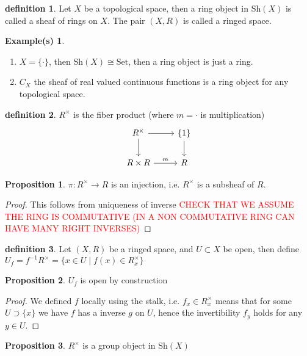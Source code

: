 \documentclass[10.5pt]{article}
\theoremstyle{definition}
\newtheorem{proposition}{Proposition}
\newtheorem{definition}{definition}
\newtheorem*{example}{Example(s)}
\newcommand{\set}[1]{\{#1\}}
\begin{document}
    \begin{definition}
        Let \(X\) be a topological space, then a ring object in \(\text{Sh}(X)\) is called a sheaf of rings on \(X\). The pair \((X,R)\) is called a ringed space.
    \end{definition}

    \begin{example}
        \begin{enumerate}
            \item \(X = \set{\cdot}\), then \(\text{Sh}(X) \cong \text{Set}\), then a ring object is just a ring.
            \item \(C_X\) the sheaf of real valued continuous functions is a ring object for any topological space.
        \end{enumerate}
    \end{example}

    \begin{definition}
        \(R^\times\) is the fiber product (where \(m = \cdot\) is multiplication)
        \begin{equation*}
            \begin{tikzcd}
                R^\times \arrow[r] \arrow[d,""] &\set{1} \arrow[d,""] \\ R\times R \arrow[r,"m"] & R
            \end{tikzcd} 
        \end{equation*}
    \end{definition}
    
    \begin{proposition}
        \(\pi: R^{\times} \to R\) is an injection, i.e. \(R^{\times}\) is a subsheaf of \(R\).
    \end{proposition}
    \begin{proof}
        This follows from uniqueness of inverse \textcolor{red}{CHECK THAT WE ASSUME THE RING IS COMMUTATIVE (IN A NON COMMUTATIVE RING CAN HAVE MANY RIGHT INVERSES)}
    \end{proof}

    \begin{definition}
        Let \((X,R)\) be a ringed space, and \(U \subset X\) be open, then define \(U_f = f^{-1}R^\times = \set{x \in U \mid f(x) \in R_x^\times}\)
    \end{definition}
    \begin{proposition}
        \(U_f\) is open by construction
    \end{proposition}
    \begin{proof}
        We defined \(f\) locally using the stalk, i.e. \(f_x \in R_x^\times\) means that for some \(U \supset \set{x}\) we have \(f\) has a inverse \(g\) on \(U\), hence the invertibility \(f_y\) holds for any \(y \in U\).
    \end{proof}
    \begin{proposition}
        \(R^\times\) is a group object in \(\text{Sh}(X)\)
    \end{proposition}
\end{document}

